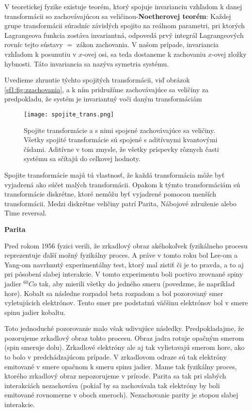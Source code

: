 \documentclass[../../main.tex]{subfiles}
\begin{document}
V teoretickej fyzike existuje teorém, ktorý spojuje invarianciu vzhľadom k danej transformácii so zachovávajúcou sa veličinou-\textbf{Noetherovej teorém}: Každej grupe transformácii súradníc závislých spojito na reálnom parametri, pri ktorých Lagrangeova funkcia zostáva invariantná, odpovedá prvý integrál Lagrangeových rovníc tejto sústavy $=$ zákon zachovania. V našom prípade, invariancia vzhľadom k posunutiu v $x$-ovej osi, sa teda dostaneme k zachovaniu $x$-ovej zložky hybnosti. Táto invariancia sa nazýva symetria systému.
 
Uvedieme zhrnutie týchto spojitých transformácii,  viď obrázok \ref{sf1:fig:zzachovania}, a k ním pridružíme zachovávajúce sa veličiny za predpokladu, že systém je invariantný voči daným transformáciám
\begin{figure}[!h]
\centering
\texttt{[image: spojite\_trans.png]}
\caption{Spojite transformácie a s nimi spojené zachovávajúce sa veličiny. Všetky spojité transformácie sú spojené s aditívnymi kvantovými číslami. Aditívne v tom zmysle, že všetky príspevky rôznych časti systému sa sčítajú do celkovej hodnoty.}
\label{sf1:fig:spojtran}
\end{figure}
\newline
Spojite transformácie majú tú vlastnosť, že každá transformácia môže byť vyjadrená ako súčet malých transformácii. Opakom k týmto transformáciám sú transformácie diskrétne, ktoré nemôžu byť vyjadrené pomocou menších transformácii. Medzi diskrétne veličiny patrí Parita, Nábojové združenie alebo Time reversal.\newline

\textbf{Parita} \par
Pred rokom 1956 fyzici verili, že zrkadlový obraz akéhokoľvek fyzikálneho procesu reprezentuje ďalší možný fyzikálny proces. A práve v tomto roku bol Lee-om a Yang-om navrhnutý experimentálny test, ktorý mal zistiť či je to pravda, a to aj pri pôsobení slabej interakcie. V tomto experimentu boli poctivo zrovnané spiny jadier $^{60}Co$ tak, aby mierili všetky do jedného smeru (povedzme, že napríklad hore). Kobalt sa následne rozpadol beta rozpadom a bol pozorovaný smer vyletujúcich elektrónov. Tento smer pre podstatnú väčšinu elektrónov bol v smere spinu jadier kobaltu.
 
Toto jednoduché pozorovanie malo však udivujúce následky. Predpokladajme, že pozorujeme zrkadlový obraz tohto procesu. Obraz jadra rotuje opačným smerom (spin smeruje dolu). Zrkadlové elektróny ale aj tak vylietavajú smerom hore, ako to bolo v predchádzajúcom prípade. V zrkadlovom odraze sú tak elektróny emitované v smere opačnom k smeru spinu jadier. Mame tak fyzikálny proces, ktorého zrkadlový obraz nepozorujeme v prírode. Parita sa tak pri slabých interakciách nezachováva (pokiaľ by sa zachovávala tak elektróny by boli emitované rovnomerne v oboch smeroch). Nezachovanie parity je stopou slabej interakcie.
\end{document}
